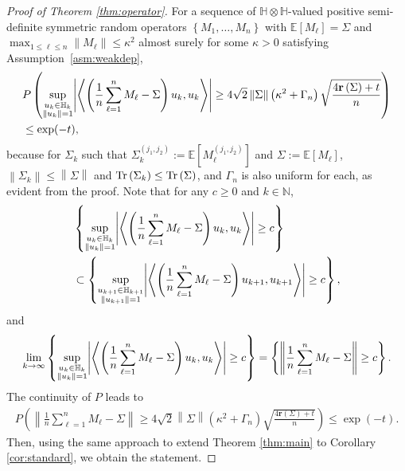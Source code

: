 \documentclass[11pt,a4paper]{article}
\theoremstyle{remark}
\theoremstyle{definition}
\theoremstyle{definition}
\newcommand{\Ep}{\mathbb{E}}
\DeclarePairedDelimiter{\bigabs}{\Bigg\lvert}{\Bigg\rvert}
\newcommand{\rc}{\color{black}}
\begin{document}
\begin{bibunit}[apalike]
\begin{proof}[Proof of Theorem \ref{thm:operator}]

For a sequence of $\mathbb{H}\otimes\mathbb{H}$-valued positive semi-definite symmetric random operators $\left\{M_{1},\ldots,M_{n}\right\}$ with $\Ep\left[M_{\ell}\right]=\Sigma$ and $\max_{1 \leq \ell \leq n}\left\|M_{\ell}\right\|\le \kappa^{2}$ almost surely for some $\kappa>0$ satisfying Assumption~\ref{asm:weakdep},
\begin{align*}
    &P\left(\sup_{\substack{u_{k}\in \mathbb{H}_{k}\\\left\|u_{k}\right\|=1}}\bigabs{\left\langle \left(\frac{1}{n}\sum_{\ell=1}^{n}M_{\ell}-\Sigma\right)u_{k},u_{k}\right\rangle }\ge {4}\sqrt{2}\left\|\Sigma\right\|\left({\kappa^{2}+\Gamma_{n}}\right)\sqrt{\frac{4\mathbf{r}\left(\Sigma\right)+t}{n}}\right)\\
    &\le \exp(-t),
\end{align*}
because for $\Sigma_{k}$ such that $\Sigma_{k}^{\left(j_{1},j_{2}\right)}:=\Ep[M_{\ell}^{\left(j_{1},j_{2}\right)}]$ and $\Sigma:=\Ep[M_{\ell}]$, $\left\|\Sigma_{k}\right\|\le \left\|\Sigma\right\|$ and $\mathrm{\rc Tr}\left(\Sigma_{k}\right)\le \mathrm{\rc Tr}\left(\Sigma\right)$, and $\Gamma_{n}$ is also uniform for each, as evident from the proof.
Note that for any $c\ge 0$ and $k\in\mathbb{N}$,
\begin{align*}
    &\left\{\sup_{\substack{u_{k}\in \mathbb{H}_{k}\\\left\|u_{k}\right\|=1}}\bigabs{\left\langle \left(\frac{1}{n}\sum_{\ell=1}^{n}M_{\ell}-\Sigma\right)u_{k},u_{k}\right\rangle }\ge c\right\} \\
    &\subset \left\{\sup_{\substack{u_{k+1}\in \mathbb{H}_{k+1}\\\left\|u_{k+1}\right\|=1}}\bigabs{\left\langle \left(\frac{1}{n}\sum_{\ell=1}^{n}M_{\ell}-\Sigma\right)u_{k+1},u_{k+1}\right\rangle } \geq c\right\},
\end{align*}
and 
\begin{align*}
    \lim_{k\to\infty}\left\{\sup_{\substack{u_{k}\in \mathbb{H}_{k}\\\left\|u_{k}\right\|=1}}\bigabs{\left\langle \left(\frac{1}{n}\sum_{\ell=1}^{n}M_{\ell}-\Sigma\right)u_{k},u_{k}\right\rangle }\ge c\right\}=\left\{\left\|\frac{1}{n}\sum_{\ell=1}^{n}M_{\ell}-\Sigma\right\|\ge c\right\}.
\end{align*}
The continuity of $P$ leads to
\begin{align*}
    P\left(\left\|\frac{1}{n}\sum_{\ell=1}^{n}M_{\ell}-\Sigma\right\|\ge {4}\sqrt{2}\left\|\Sigma\right\|\left({ \kappa^{2}+\Gamma_{n}}\right)\sqrt{\frac{4\mathbf{r}\left(\Sigma\right)+t}{n}}\right)\le \exp(-t).
\end{align*}
Then, using the same approach to extend Theorem \ref{thm:main} to Corollary \ref{cor:standard}, we obtain the statement.
\end{proof}



\end{bibunit}
\end{document}
